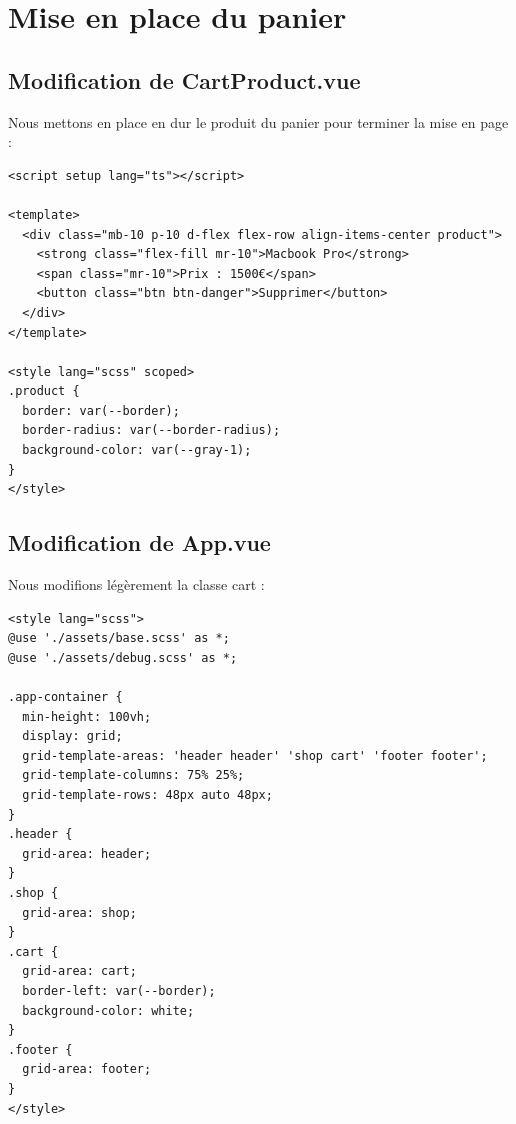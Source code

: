 \documentclass{article}
\begin{document}


\section{Mise en place du panier}
\subsection{Modification de {\color{monOrange}CartProduct.vue}}
Nous mettons en place en dur le produit du panier pour terminer la mise en page :
\begin{verbatim}
<script setup lang="ts"></script>

<template>
  <div class="mb-10 p-10 d-flex flex-row align-items-center product">
    <strong class="flex-fill mr-10">Macbook Pro</strong>
    <span class="mr-10">Prix : 1500€</span>
    <button class="btn btn-danger">Supprimer</button>
  </div>
</template>

<style lang="scss" scoped>
.product {
  border: var(--border);
  border-radius: var(--border-radius);
  background-color: var(--gray-1);
}
</style>
\end{verbatim}

\subsection{Modification de {\color{monOrange}App.vue}}
Nous modifions légèrement la classe {\color{monOrange}cart} :
\begin{verbatim}
<style lang="scss">
@use './assets/base.scss' as *;
@use './assets/debug.scss' as *;

.app-container {
  min-height: 100vh;
  display: grid;
  grid-template-areas: 'header header' 'shop cart' 'footer footer';
  grid-template-columns: 75% 25%;
  grid-template-rows: 48px auto 48px;
}
.header {
  grid-area: header;
}
.shop {
  grid-area: shop;
}
.cart {
  grid-area: cart;
  border-left: var(--border);
  background-color: white;
}
.footer {
  grid-area: footer;
}
</style> 
\end{verbatim}
\end{document}
